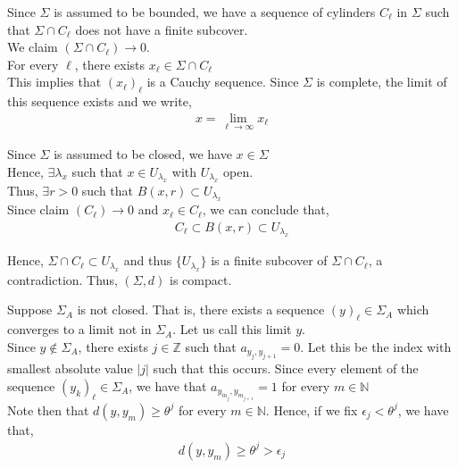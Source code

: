 \documentclass[12pt]{article}
\newenvironment{problem}[2][Problem]{\begin{trivlist}
\item[\hskip \labelsep {\bfseries #1}\hskip \labelsep {\bfseries #2.}]}{\end{trivlist}}
\begin{document}
Since $\Sigma$ is assumed to be bounded, we have a sequence of cylinders $C_{\ell}$ in $\Sigma$ such that $\Sigma \cap C_{\ell}$ does not have a finite subcover.\\

We claim $(\Sigma \cap C_{\ell}) \to 0$.\\

For every $\ell$, there exists $x_{\ell} \in \Sigma \cap C_{\ell}$\\

This implies that $(x_{\ell})_{\ell}$ is a Cauchy sequence. Since $\Sigma$ is complete, the limit of this sequence exists and we write,
\begin{align*}
x = \lim_{\ell \to \infty} x_{\ell}
\end{align*}

Since $\Sigma$ is assumed to be closed, we have $x \in \Sigma$\\

Hence, $\exists \lambda_x$ such that $x \in U_{\lambda_x}$ with $U_{\lambda_x}$ open.\\

Thus, $\exists r > 0$ such that $B(x, r) \subset U_{\lambda_x}$\\

Since claim $(C_{\ell}) \to 0$ and $x_{\ell} \in C_{\ell}$, we can conclude that,
\begin{align*}
C_{\ell} \subset B(x, r) \subset U_{\lambda_x}
\end{align*}

Hence, $\Sigma \cap C_{\ell} \subset U_{\lambda_x}$ and thus $\{U_{\lambda_x}\}$ is a finite subcover of $\Sigma \cap C_{\ell}$, a contradiction. Thus, $(\Sigma, d)$ is compact.

\begin{problem}{2}
\end{problem}

Suppose $\Sigma_A$ is not closed. That is, there exists a sequence $(y)_{\ell} \in \Sigma_A$ which converges to a limit not in $\Sigma_A$. Let us call this limit $y$.\\

Since $y \not\in \Sigma_A$, there exists $j \in \mathbb{Z}$ such that $a_{y_j, y_{j+1}} = 0$. Let this be the index with smallest absolute value $|j|$ such that this occurs. Since every element of the sequence $(y_k)_{\ell} \in \Sigma_A$, we have that $a_{y_{m_j}, y_{m_{j+1}}} = 1$ for every $m \in \mathbb{N}$\\

Note then that $d(y, y_m) \geq \theta^j$ for every $m \in \mathbb{N}$. Hence, if we fix $\epsilon_j < \theta^j$, we have that,
\begin{align*}
d(y, y_m) \geq \theta^j > \epsilon_j
\end{align*}
\end{document}
